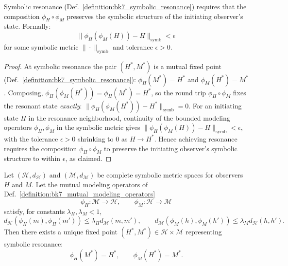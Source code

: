 \begin{lemma}
\label{lemma:bk7_information_preservation}
Symbolic resonance (Def.~\ref{definition:bk7_symbolic_resonance}) requires that the composition $\phi_H \circ \phi_M$ preserves the symbolic structure of the initiating observer's state. Formally:
$$\|\phi_H(\phi_M(H)) - H\|_{\text{symb}} < \epsilon$$
for some symbolic metric $\|\cdot\|_{\text{symb}}$ and tolerance $\epsilon > 0$.
\end{lemma}
\begin{proof}
\label{proof:bk7_information_preservation}
\leavevmode
At symbolic resonance the pair $(H^*,M^*)$ is a mutual fixed point (Def.~\ref{definition:bk7_symbolic_resonance}): $\phi_H(M^*)=H^*$ and $\phi_M(H^*)=M^*$. Composing, $\phi_H(\phi_M(H^*))=\phi_H(M^*)=H^*$, so the round trip $\phi_H\circ\phi_M$ fixes the resonant state \emph{exactly}: $\|\phi_H(\phi_M(H^*))-H^*\|_{\text{symb}}=0$. For an initiating state $H$ in the resonance neighborhood, continuity of the bounded modeling operators $\phi_H,\phi_M$ in the symbolic metric gives $\|\phi_H(\phi_M(H))-H\|_{\text{symb}}<\epsilon$, with the tolerance $\epsilon>0$ shrinking to $0$ as $H\to H^*$. Hence achieving resonance requires the composition $\phi_H\circ\phi_M$ to preserve the initiating observer's symbolic structure to within $\epsilon$, as claimed.
\end{proof}

\begin{theorem}
\label{theorem:bk7_two_way_street_fixed_point}
Let $(\mathcal{H},d_{\mathcal{H}})$ and $(\mathcal{M},d_{\mathcal{M}})$ be complete symbolic metric spaces for observers $H$ and $M$. Let the mutual modeling operators of Def.~\ref{definition:bk7_mutual_modeling_operators}
\[
\phi_H:\mathcal{M}\to\mathcal{H},
\qquad
\phi_M:\mathcal{H}\to\mathcal{M}
\]
satisfy, for constants $\lambda_H,\lambda_M<1$,
\[
d_{\mathcal{H}}(\phi_H(m),\phi_H(m'))\leq \lambda_H d_{\mathcal{M}}(m,m'),
\qquad
d_{\mathcal{M}}(\phi_M(h),\phi_M(h'))\leq \lambda_M d_{\mathcal{H}}(h,h').
\]
Then there exists a unique fixed point $(H^*, M^*)\in \mathcal{H}\times\mathcal{M}$ representing symbolic resonance:
\[
\phi_H(M^*)=H^*,
\qquad
\phi_M(H^*)=M^*.
\]
\end{theorem}

